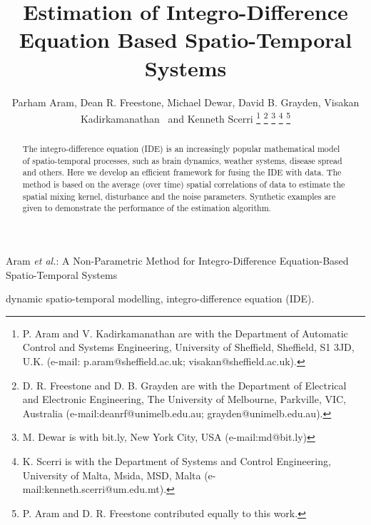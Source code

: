 \documentclass[10pt,twocolumn,twoside]{IEEEtran}
\begin{document}
    \title{Estimation of Integro-Difference Equation Based Spatio-Temporal Systems}

    \author{
        Parham Aram, 
        Dean R. Freestone, 
        Michael Dewar, 
        David B.  Grayden, 
        Visakan Kadirkamanathan~ 
        and Kenneth Scerri  %
        \thanks{P.  Aram and V. Kadirkamanathan are with the Department of Automatic Control and Systems Engineering, University of Sheffield, Sheffield, S1 3JD, U.K. (e-mail:  p.aram@sheffield.ac.uk; visakan@sheffield.ac.uk). }%
        \thanks{D.  R.  Freestone and D.  B.  Grayden are with the Department of Electrical and Electronic Engineering, The University of Melbourne, Parkville, VIC, Australia (e-mail:deanrf@unimelb.edu.au; grayden@unimelb.edu.au).}
        \thanks{M.  Dewar is with bit.ly, New York City, USA (e-mail:md@bit.ly)}  
        \thanks{K.  Scerri is with the Department of Systems and Control Engineering, University of Malta, Msida, MSD, Malta (e-mail:kenneth.scerri@um.edu.mt).}
        \thanks{P.  Aram and D.  R.  Freestone contributed equally to this work.}
    } 

    {Aram \MakeLowercase{\textit{et al.}}: A Non-Parametric Method for Integro-Difference Equation-Based Spatio-Temporal Systems}
    \maketitle


\begin{abstract}
    The integro-difference equation (IDE) is an increasingly popular mathematical model of spatio-temporal processes, such as brain dynamics, weather systems, disease spread and others.
    Here we develop an efficient framework for fusing the IDE with data.
    The method is based on the average (over time) spatial correlations of data to estimate the spatial mixing kernel, disturbance and the noise parameters.
    Synthetic examples are given to demonstrate the performance of the estimation algorithm.
\end{abstract}

\begin{IEEEkeywords}
    dynamic spatio-temporal modelling, integro-difference equation (IDE).

\end{IEEEkeywords}
\end{document}
